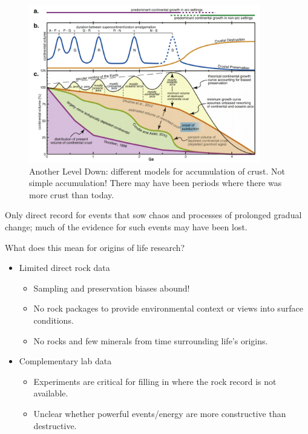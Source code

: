 \documentclass[]{article}
\begin{document}
\begin{figure}[H]
	\caption[Another Level Down: different models for accumulation of crust.]{Another Level Down: different models for accumulation of crust. Not simple accumulation! There may have been periods where there was more crust than today.}\label{fig:AnotherLevelDown} 
	\includegraphics[width=0.9\textwidth]{AnotherLevelDown}
\end{figure}

Only direct record for events that sow chaos and processes of prolonged gradual change; much of the evidence for such events may have been lost.

What does this mean for origins of life research?
\begin{itemize}
	\item Limited direct rock data
	\begin{itemize}
		\item 	Sampling and preservation
		biases abound!
			\item No rock packages to
		provide environmental
		context or views into surface
		conditions.
		\item 	No rocks and few minerals
		from time surrounding life’s
		origins.
	\end{itemize}
	\item Complementary lab data
	\begin{itemize}
		\item Experiments are critical for
		filling in where the rock
		record is not available.
			\item Unclear whether powerful
		events/energy are more
		constructive than destructive.
	\end{itemize}
\end{itemize}
\end{document}
